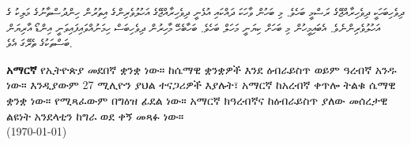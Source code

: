 \documentclass[a4paper]{article}
\begin{document}
\begin{divehi}\small\sloppy
ދިވެހިބަހަކީ ދިވެހިރާއްޖޭގެ ރަސްމީ ބަހެވެ. މި ބަހުން ވާހަކަ ދައްކައި އުޅެނީ ދިވެހިރާއްޖޭގެ އަހުލުވެރިންގެ އިތުރުން ހިންދުސްތާނުގެ މަލިކު ގެ
އަހުލުވެރިންނެވެ. އެބައިމީހުން މި ބަހަށް ކިޔަނީ މަހަލް ބަހެވެ. ބަހާބެހޭ މާހިރުން ދިވެހިބަސް ހިމަނުއްވައިފައިވަނީ އިންޑޯ އާރިޔަން ބަސްތަކުގެ
ތެރޭގަ އެވެ. 
\end{divehi}

%

\begin{amharic}
\textbf{አማርኛ} የኢትዮጵያ መደበኛ ቋንቋ ነው። ከሴማዊ ቋንቋዎች እንደ ዕብራይስጥ ወይም ዓረብኛ አንዱ ነው። እንዲያውም 27 ሚሊዮን ያህል ተናጋሪዎች እያሉት፣ አማርኛ ከአረብኛ ቀጥሎ ትልቁ ሴማዊ ቋንቋ ነው። የሚጻፈውም በግዕዝ ፊደል ነው። አማርኛ ክዓረብኛና ከዕብራይስጥ ያለው መሰረታዊ ልዩነት አንደላቲን ከግራ ወደ ቀኝ መጻፉ ነው። \\
(\today)
\end{amharic}
\end{document}
